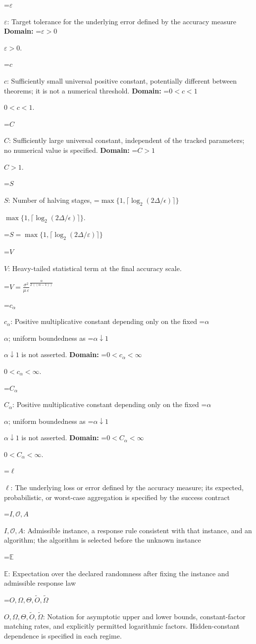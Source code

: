 \documentclass[10pt,a4paper]{article}
\newcommand{\AtlasMath}[1]{\par\begingroup\centering\setbox0=\hbox{$\displaystyle #1$}\ifdim\wd0>1.4\linewidth\typeout{ATLAS WIDE FORMULA: \the\wd0}\fi\ifdim\wd0>\linewidth\resizebox{\linewidth}{!}{\box0}\else\box0\fi\par\endgroup}
\newcommand{\AtlasInlineMath}[1]{\begingroup\setbox0=\hbox{$#1$}\ifdim\wd0>.4\linewidth\endgroup\AtlasMath{#1}\else\endgroup$#1$\fi}
\begin{document}
\AtlasInlineMath{\varepsilon}: Target tolerance for the underlying error defined by the accuracy measure \textbf{Domain:} \AtlasInlineMath{\varepsilon>0}.

\AtlasInlineMath{c}: Sufficiently small universal positive constant, potentially different between theorems; it is not a numerical threshold. \textbf{Domain:} \AtlasInlineMath{0<c<1}.

\AtlasInlineMath{C}: Sufficiently large universal constant, independent of the tracked parameters; no numerical value is specified. \textbf{Domain:} \AtlasInlineMath{C>1}.

\AtlasInlineMath{S}: Number of halving stages, \AtlasInlineMath{\max\{1,\lceil\log_2(2\Delta/\epsilon)\rceil\}}.


\AtlasMath{S=\max\{1,\lceil\log_2(2\Delta/\varepsilon)\rceil\}}


\AtlasInlineMath{V}: Heavy-tailed statistical term at the final accuracy scale.


\AtlasMath{V={\frac{{\sigma}^{2}}{\mu\,\varepsilon}}^{\frac{\alpha}{2\,((\alpha-1))}}}


\AtlasInlineMath{c_\alpha}: Positive multiplicative constant depending only on the fixed \AtlasInlineMath{\alpha}; uniform boundedness as \AtlasInlineMath{\alpha\downarrow1} is not asserted. \textbf{Domain:} \AtlasInlineMath{0<c_\alpha<\infty}.

\AtlasInlineMath{C_\alpha}: Positive multiplicative constant depending only on the fixed \AtlasInlineMath{\alpha}; uniform boundedness as \AtlasInlineMath{\alpha\downarrow1} is not asserted. \textbf{Domain:} \AtlasInlineMath{0<C_\alpha<\infty}.

\AtlasInlineMath{\ell}: The underlying loss or error defined by the accuracy measure; its expected, probabilistic, or worst-case aggregation is specified by the success contract

\AtlasInlineMath{I,\mathcal{O},A}: Admissible instance, a response rule consistent with that instance, and an algorithm; the algorithm is selected before the unknown instance

\AtlasInlineMath{\mathbb{E}}: Expectation over the declared randomness after fixing the instance and admissible response law

\AtlasInlineMath{O,\Omega,\Theta,\widetilde{O},\widetilde\Omega}: Notation for asymptotic upper and lower bounds, constant-factor matching rates, and explicitly permitted logarithmic factors. Hidden-constant dependence is specified in each regime.
\end{document}
